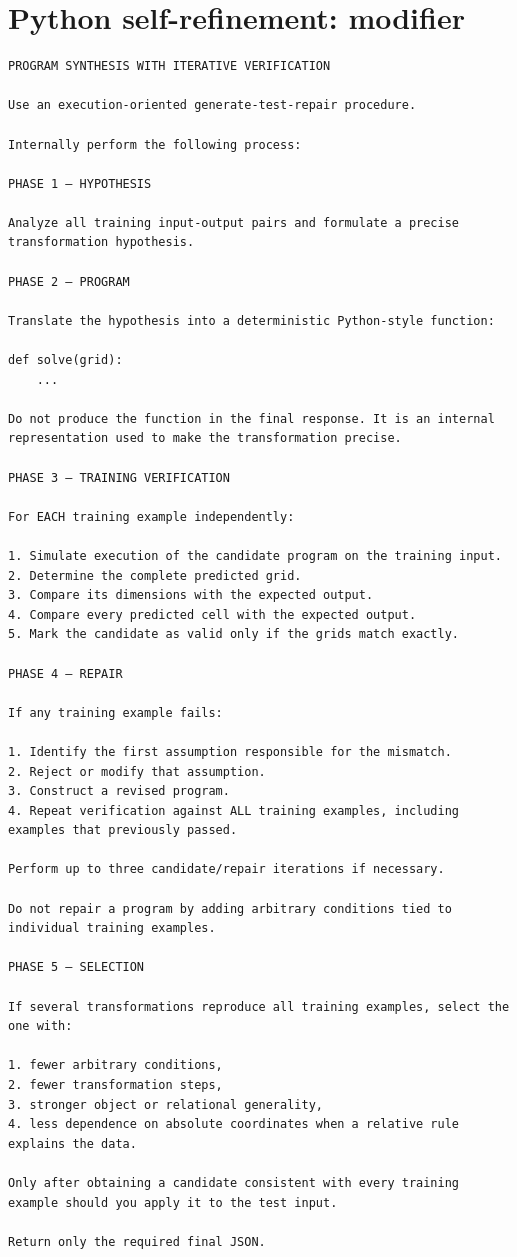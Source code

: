 \documentclass[a4paper,10pt]{article}
\begin{document}
\section*{Python self-refinement: modifier}
\begin{Verbatim}[breaklines=true,breakanywhere=false,breaksymbolleft={},fontsize=\small]
PROGRAM SYNTHESIS WITH ITERATIVE VERIFICATION

Use an execution-oriented generate-test-repair procedure.

Internally perform the following process:

PHASE 1 — HYPOTHESIS

Analyze all training input-output pairs and formulate a precise transformation hypothesis.

PHASE 2 — PROGRAM

Translate the hypothesis into a deterministic Python-style function:

def solve(grid):
    ...

Do not produce the function in the final response. It is an internal representation used to make the transformation precise.

PHASE 3 — TRAINING VERIFICATION

For EACH training example independently:

1. Simulate execution of the candidate program on the training input.
2. Determine the complete predicted grid.
3. Compare its dimensions with the expected output.
4. Compare every predicted cell with the expected output.
5. Mark the candidate as valid only if the grids match exactly.

PHASE 4 — REPAIR

If any training example fails:

1. Identify the first assumption responsible for the mismatch.
2. Reject or modify that assumption.
3. Construct a revised program.
4. Repeat verification against ALL training examples, including examples that previously passed.

Perform up to three candidate/repair iterations if necessary.

Do not repair a program by adding arbitrary conditions tied to individual training examples.

PHASE 5 — SELECTION

If several transformations reproduce all training examples, select the one with:

1. fewer arbitrary conditions,
2. fewer transformation steps,
3. stronger object or relational generality,
4. less dependence on absolute coordinates when a relative rule explains the data.

Only after obtaining a candidate consistent with every training example should you apply it to the test input.

Return only the required final JSON.
\end{Verbatim}
\end{document}
